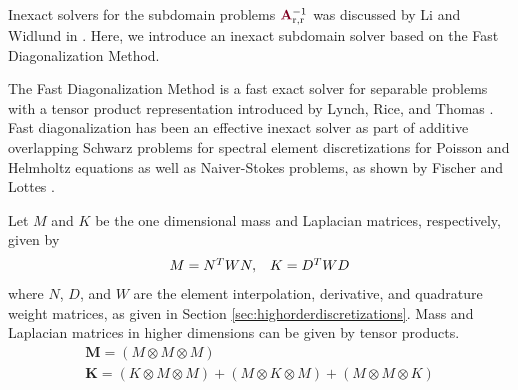 Inexact solvers for the subdomain problems ${\color{burgundy}\mathbf{A}}_{\text{r}, \text{r}}^{-1}$ was discussed by Li and Widlund in \cite{li2007use}.
Here, we introduce an inexact subdomain solver based on the Fast Diagonalization Method.

The Fast Diagonalization Method is a fast exact solver for separable problems with a tensor product representation introduced by Lynch, Rice, and Thomas \cite{lynch1964direct}.
Fast diagonalization has been an effective inexact solver as part of additive overlapping Schwarz problems for spectral element discretizations for Poisson and Helmholtz equations as well as Naiver-Stokes problems, as shown by Fischer and Lottes \cite{fischer2005hybrid}.

Let $M$ and $K$ be the one dimensional mass and Laplacian matrices, respectively, given by
\begin{equation}
\begin{array}{c c}
M = N^T W N,  &  K = D^T W D
\end{array}
\end{equation}
where $N$, $D$, and $W$ are the element interpolation, derivative, and quadrature weight matrices, as given in Section \ref{sec:highorderdiscretizations}.
Mass and Laplacian matrices in higher dimensions can be given by tensor products.
\begin{equation}
\begin{array}{c}
\mathbf{M} = \left( M \otimes M \otimes M \right)  \\
\mathbf{K} = \left( K \otimes M \otimes M \right) + \left( M \otimes K \otimes M \right) + \left( M \otimes M \otimes K \right)  \\
\end{array}
\end{equation}

